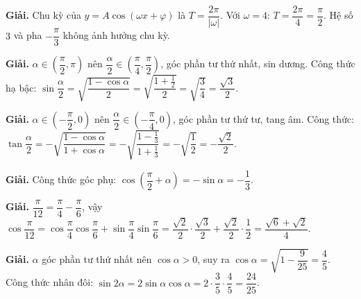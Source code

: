 \documentclass[11pt, a4paper]{article}
\begin{document}
\vspace{0.3cm}
\begin{dapan}[13 — Đáp án B]

\textbf{Giải.} Chu kỳ của $y=A\cos(\omega x+\varphi)$ là $T=\dfrac{2\pi}{\lvert\omega\rvert}$. Với $\omega=4$: $T=\dfrac{2\pi}{4}=\dfrac{\pi}{2}$. Hệ số $3$ và pha $-\dfrac{\pi}{3}$ không ảnh hưởng chu kỳ.


\end{dapan}
\vspace{0.3cm}
\begin{dapan}[14 — Đáp án B]

\textbf{Giải.} $\alpha\in\left(\dfrac{\pi}{2},\pi\right)$ nên $\dfrac{\alpha}{2}\in\left(\dfrac{\pi}{4},\dfrac{\pi}{2}\right)$, góc phần tư thứ nhất, sin dương. Công thức hạ bậc: $\sin\dfrac{\alpha}{2}=\sqrt{\dfrac{1-\cos\alpha}{2}}=\sqrt{\dfrac{1+\frac{1}{2}}{2}}=\sqrt{\dfrac{3}{4}}=\dfrac{\sqrt{3}}{2}$.


\end{dapan}
\vspace{0.3cm}
\begin{dapan}[15 — Đáp án C]

\textbf{Giải.} $\alpha\in\left(-\dfrac{\pi}{2},0\right)$ nên $\dfrac{\alpha}{2}\in\left(-\dfrac{\pi}{4},0\right)$, góc phần tư thứ tư, tang âm. Công thức: $\tan\dfrac{\alpha}{2}=-\sqrt{\dfrac{1-\cos\alpha}{1+\cos\alpha}}=-\sqrt{\dfrac{1-\frac{1}{3}}{1+\frac{1}{3}}}=-\sqrt{\dfrac{1}{2}}=-\dfrac{\sqrt{2}}{2}$.


\end{dapan}
\vspace{0.3cm}
\begin{dapan}[16 — Đáp án D]

\textbf{Giải.} Công thức góc phụ: $\cos\left(\dfrac{\pi}{2}+\alpha\right)=-\sin\alpha=-\dfrac{1}{3}$.


\end{dapan}
\vspace{0.3cm}
\begin{dapan}[17 — Đáp án B]

\textbf{Giải.} $\dfrac{\pi}{12}=\dfrac{\pi}{4}-\dfrac{\pi}{6}$, vậy $\cos\dfrac{\pi}{12}=\cos\dfrac{\pi}{4}\cos\dfrac{\pi}{6}+\sin\dfrac{\pi}{4}\sin\dfrac{\pi}{6}=\dfrac{\sqrt{2}}{2}\cdot\dfrac{\sqrt{3}}{2}+\dfrac{\sqrt{2}}{2}\cdot\dfrac{1}{2}=\dfrac{\sqrt{6}+\sqrt{2}}{4}$.


\end{dapan}
\vspace{0.3cm}
\begin{dapan}[18 — Đáp án B]

\textbf{Giải.} $\alpha$ góc phần tư thứ nhất nên $\cos\alpha>0$, suy ra $\cos\alpha=\sqrt{1-\dfrac{9}{25}}=\dfrac{4}{5}$. Công thức nhân đôi: $\sin 2\alpha=2\sin\alpha\cos\alpha=2\cdot\dfrac{3}{5}\cdot\dfrac{4}{5}=\dfrac{24}{25}$.


\end{dapan}
\end{document}
